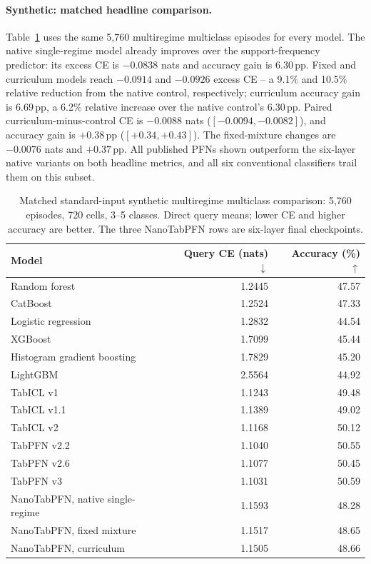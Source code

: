 \documentclass{article}
\newcommand{\pp}{\,\mathrm{pp}}
\begin{document}
\paragraph{Synthetic: matched headline comparison.} Table~\ref{tab:headline} uses the same 5,760 multiregime multiclass episodes for every model. The native single-regime model already improves over the support-frequency predictor: its excess CE is $-0.0838$ nats and accuracy gain is $6.30\pp$. Fixed and curriculum models reach $-0.0914$ and $-0.0926$ excess CE -- a 9.1\% and 10.5\% relative reduction from the native control, respectively; curriculum accuracy gain is $6.69\pp$, a 6.2\% relative increase over the native control's $6.30\pp$. Paired curriculum-minus-control CE is $-0.0088$ nats ($[-0.0094,-0.0082]$), and accuracy gain is $+0.38\pp$ ($[+0.34,+0.43]$). The fixed-mixture changes are $-0.0076$ nats and $+0.37\pp$. All published PFNs shown outperform the six-layer native variants on both headline metrics, and all six conventional classifiers trail them on this subset.

\begin{table}[t]
\caption{Matched standard-input synthetic multiregime multiclass comparison: 5,760 episodes, 720 cells, 3--5 classes. Direct query means; lower CE and higher accuracy are better. The three NanoTabPFN rows are six-layer final checkpoints.}
\label{tab:headline}\centering\small
\begin{tabular}{@{}lrr@{}}\toprule
Model & Query CE (nats) $\downarrow$ & Accuracy (\%) $\uparrow$ \\\midrule
Random forest & 1.2445 & 47.57\\
CatBoost & 1.2524 & 47.33\\
Logistic regression & 1.2832 & 44.54\\
XGBoost & 1.7099 & 45.44\\
Histogram gradient boosting & 1.7829 & 45.20\\
LightGBM & 2.5564 & 44.92\\\midrule
TabICL v1 & 1.1243 & 49.48\\
TabICL v1.1 & 1.1389 & 49.02\\
TabICL v2 & 1.1168 & 50.12\\
TabPFN v2.2 & 1.1040 & 50.55\\
TabPFN v2.6 & 1.1077 & 50.45\\
TabPFN v3 & 1.1031 & 50.59\\\midrule
NanoTabPFN, native single-regime & 1.1593 & 48.28\\
NanoTabPFN, fixed mixture & 1.1517 & 48.65\\
NanoTabPFN, curriculum & 1.1505 & 48.66\\\bottomrule
\end{tabular}
\end{table}
\end{document}
